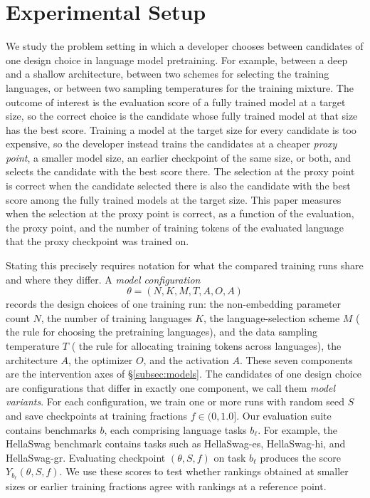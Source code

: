 \section{Experimental Setup}
\label{sec:methodology}
We study the problem setting in which a developer chooses between candidates of one design choice in language model pretraining. For example, between a deep and a shallow architecture, between two schemes for selecting the training languages, or between two sampling temperatures for the training mixture. The outcome of interest is the evaluation score of a fully trained model at a target size, so the correct choice is the candidate whose fully trained model at that size has the best score. Training a model at the target size for every candidate is too expensive, so the developer instead trains the candidates at a cheaper \emph{proxy point}, a smaller model size, an earlier checkpoint of the same size, or both, and selects the candidate with the best score there. The selection at the proxy point is correct when the candidate selected there is also the candidate with the best score among the fully trained models at the target size. This paper measures when the selection at the proxy point is correct, as a function of the evaluation, the proxy point, and the number of training tokens of the evaluated language that the proxy checkpoint was trained on.

Stating this precisely requires notation for what the compared training runs share and where they differ. A \emph{model configuration}
\[
\theta=(N,K,M,T,A,O,A)
\]
records the design choices of one training run: the non-embedding parameter count $N$, the number of training languages $K$, the language-selection scheme $M$ (\ie{} the rule for choosing the pretraining languages), and the data sampling temperature $T$ (\ie{} the rule for allocating training tokens across languages), the architecture $A$, the optimizer $O$, and the activation $A$.
These seven components are the intervention axes of \S\ref{subsec:models}. The candidates of one design choice are configurations that differ in exactly one component, we call them \emph{model variants}. %
For each configuration, we train one or more runs with random seed $S$ and save checkpoints at training fractions $f\in (0,1.0]$.
Our evaluation suite contains benchmarks $b$, each comprising language tasks $b_\ell$. For example, the HellaSwag benchmark contains tasks such as HellaSwag-es, HellaSwag-hi, and HellaSwag-gr. Evaluating checkpoint $(\theta,S,f)$ on task $b_\ell$ produces the score
$Y_{b_\ell}(\theta,S,f)$.
We use these scores to test whether rankings obtained at smaller sizes or earlier training fractions agree with rankings at a reference point.


